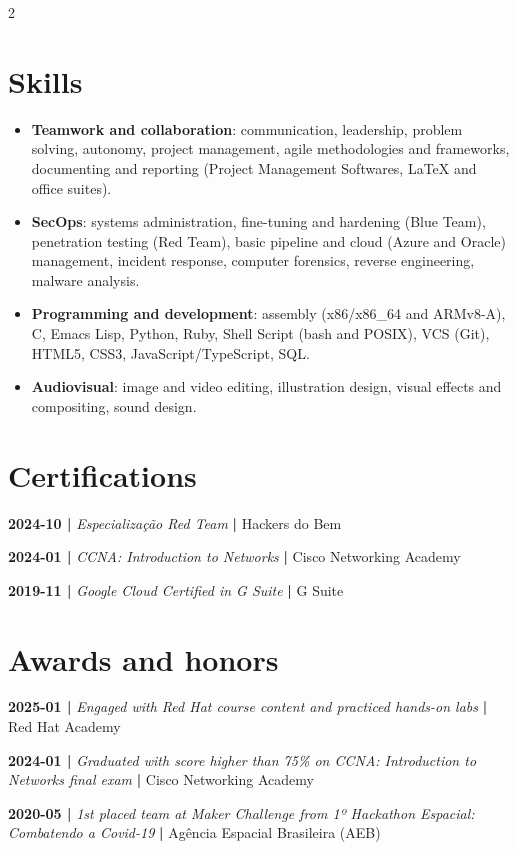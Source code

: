 \documentclass[a4paper,10pt]{article}
\begin{document}
\begin{multicols*}{2}
\section*{Skills}
\label{sec:orgccc8d4d}
\begin{itemize}
\item \textbf{Teamwork and collaboration}: communication, leadership, problem solving,
autonomy, project management, agile methodologies and frameworks, documenting
and reporting (Project Management Softwares, \LaTeX{} and office suites).

\item \textbf{SecOps}: systems administration, fine-tuning and hardening (Blue Team),
penetration testing (Red Team), basic pipeline and cloud (Azure and Oracle)
management, incident response, computer forensics, reverse engineering,
malware analysis.

\item \textbf{Programming and development}: assembly (x86/x86\_64 and ARMv8-A), C, Emacs
Lisp, Python, Ruby, Shell Script (bash and POSIX), VCS (Git), HTML5, CSS3,
JavaScript/TypeScript, SQL.

\item \textbf{Audiovisual}: image and video editing, illustration design, visual effects
and compositing, sound design.
\end{itemize}
\section*{Certifications}
\label{sec:org9b51ff4}
\noindent \textbf{2024-10 |} \emph{Especialização Red Team} \textbf{|} Hackers do Bem

\noindent \textbf{2024-01 |} \emph{CCNA: Introduction to Networks} \textbf{|} Cisco
Networking Academy

\noindent \textbf{2019-11 |} \emph{Google Cloud Certified in G Suite} \textbf{|} G Suite
\section*{Awards and honors}
\label{sec:org97642bd}
\noindent \textbf{2025-01 |} \emph{Engaged with Red Hat course content and
practiced hands-on labs} \textbf{|} Red Hat Academy

\noindent \textbf{2024-01 |} \emph{Graduated with score higher than 75\% on CCNA:
Introduction to Networks final exam} \textbf{|} Cisco Networking Academy

\noindent \textbf{2020-05 |} \emph{1st placed team at Maker Challenge from 1º
Hackathon Espacial: Combatendo a Covid-19} \textbf{|} Agência Espacial Brasileira (AEB)

\end{multicols*}
\end{document}

